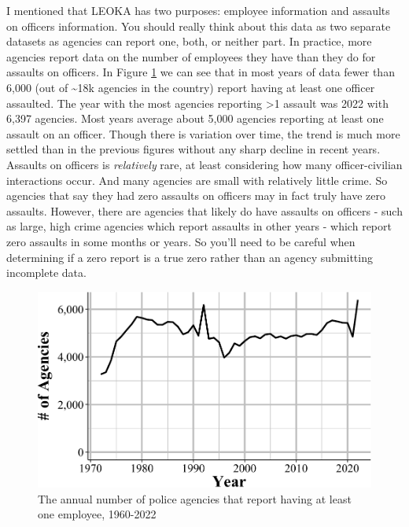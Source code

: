 \documentclass[
  12pt,
  openany]{book}
\begin{document}
I mentioned that LEOKA has two purposes: employee information and assaults on officers information. You should really think about this data as two separate datasets as agencies can report one, both, or neither part. In practice, more agencies report data on the number of employees they have than they do for assaults on officers. In Figure \ref{fig:leokaAgenciesAssaults} we can see that in most years of data fewer than 6,000 (out of \textasciitilde18k agencies in the country) report having at least one officer assaulted. The year with the most agencies reporting \textgreater1 assault was 2022 with 6,397 agencies. Most years average about 5,000 agencies reporting at least one assault on an officer. Though there is variation over time, the trend is much more settled than in the previous figures without any sharp decline in recent years. Assaults on officers is \emph{relatively} rare, at least considering how many officer-civilian interactions occur. And many agencies are small with relatively little crime. So agencies that say they had zero assaults on officers may in fact truly have zero assaults. However, there are agencies that likely do have assaults on officers - such as large, high crime agencies which report assaults in other years - which report zero assaults in some months or years. So you'll need to be careful when determining if a zero report is a true zero rather than an agency submitting incomplete data.

\begin{figure}

{\centering \includegraphics[width=0.9\linewidth]{07_leoka_files/figure-latex/leokaAgenciesAssaults-1} 

}

\caption{The annual number of police agencies that report having at least one employee, 1960-2022}\label{fig:leokaAgenciesAssaults}
\end{figure}
\end{document}
